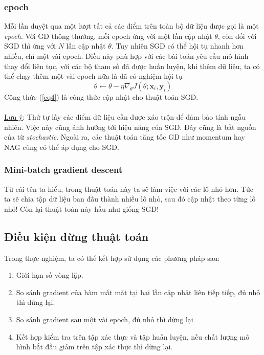 \documentclass{article}
\begin{document}
\subsubsection*{epoch}
Mỗi lần duyệt qua một lượt tất cả các điểm trên toàn bộ dữ liệu được gọi là một \textit{epoch}. Với GD thông thường, mỗi epoch ứng với một lần cập nhật $\theta$, còn đối với SGD thì ứng với $N$ lần cập nhật $\theta$. Tuy nhiên SGD có thể hội tụ nhanh hơn nhiều, chỉ một vài epoch. Điều này phù hợp với các bài toán yêu cầu mô hình thay đổi liên tục, với các bộ tham số đã được huấn luyện, khi thêm dữ liệu, ta có thể chạy thêm một vài epoch nữa là đã có nghiệm hội tụ
\begin{equation}
    \theta \leftarrow \theta - \eta \nabla_{\theta} J{(\theta;\textbf{x}_i, \textbf{y}_i)}
    \label{eq4}
\end{equation}
Công thức (\ref{eq4}) là công thức cập nhật cho thuật toán SGD. \\\\
\underline{Lưu ý}: Thứ tự lấy các điểm dữ liệu cần được xáo trộn để đảm bảo tính ngẫu nhiên. Việc này cũng ảnh hưởng tới hiệu năng của SGD. Đây cũng là bắt nguồn của từ \textit{stochastic}. Ngoài ra, các thuật toán tăng tốc GD như momentum hay NAG cũng có thể áp dụng cho SGD.
\subsubsection{Mini-batch gradient descent}
Từ cái tên ta hiểu, trong thuật toán này ta sẽ làm việc với các lô nhỏ hơn. Tức ta sẽ chia tập dữ liệu ban đầu thành nhiều lô nhỏ, sau đó cập nhật theo từng lô nhỏ! Còn lại thuật toán này hầu như giống SGD!

\subsection{Điều kiện dừng thuật toán}
Trong thực nghiệm, ta có thể kết hợp sử dụng các phương pháp sau:
\begin{enumerate}
    \item Giới hạn số vòng lặp.
    \item So sánh gradient của hàm mất mát tại hai lần cập nhật liên tiếp tiếp, đủ nhỏ thì dừng lại.
    \item So sánh gradient sau một vài epoch, đủ nhỏ thì dừng lại
    \item Kết hợp kiểm tra trên tập xác thực và tập huấn luyện, nếu chất lượng mô hình bắt đầu giảm trên tập xác thực thì dừng lại.
\end{enumerate}
\end{document}

